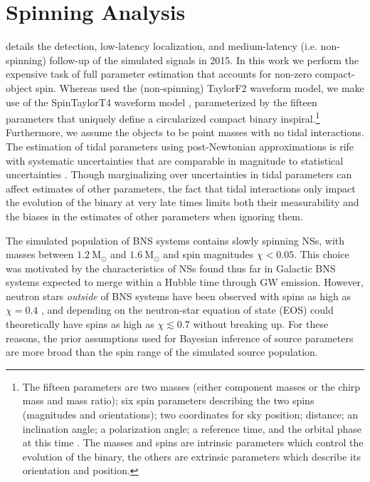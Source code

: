 \section{Spinning Analysis}
\label{sec:spin}

\citet{Singer_2014} details the detection, low-latency localization, and medium-latency (i.e. non-spinning) follow-up of the simulated signals in 2015. In this work we perform the expensive task of full parameter estimation that accounts for non-zero compact-object spin. Whereas \citet{Singer_2014} used the (non-spinning) TaylorF2 waveform model, we make use of the SpinTaylorT4 waveform model \citep{Buonanno_2003,Buonanno_2009}, parameterized by the fifteen parameters that uniquely define a circularized compact binary inspiral.\footnote{The fifteen parameters are two masses (either component masses or the chirp mass and mass ratio); six spin parameters describing the two spins (magnitudes and orientations); two coordinates for sky position; distance; an inclination angle; a polarization angle; a reference time, and the orbital phase at this time \citep[see][for more details]{Veitch_2015}. The masses and spins are intrinsic parameters which control the evolution of the binary, the others are extrinsic parameters which describe its orientation and position.} Furthermore, we assume the objects to be point masses with no tidal interactions.  The estimation of tidal parameters using post-Newtonian approximations is rife with systematic uncertainties that are comparable in magnitude to statistical uncertainties \cite{Wade_2014}. Though marginalizing over uncertainties in tidal parameters can affect estimates of other parameters, the fact that tidal interactions only impact the evolution of the binary at very late times limits both their measurability and the biases in the estimates of other parameters when ignoring them. 

The simulated population of BNS systems contains slowly spinning NSs, with masses between $1.2~\mathrm{M}_\odot$ and $1.6~\mathrm{M}_\odot$ and spin magnitudes $\chi < 0.05$.  This choice was motivated by the characteristics of NSs found thus far in Galactic BNS systems expected to merge within a Hubble time through GW emission. However, neutron stars \emph{outside} of BNS systems have been observed with spins as high as $\chi = 0.4$ \citep{Hessels_2006,Brown_2012}, and depending on the neutron-star equation of state (EOS) could theoretically have spins as high as $\chi \lesssim 0.7$ \citep{Lo_2011} without breaking up.  For these reasons, the prior assumptions used for Bayesian inference of source parameters are more broad than the spin range of the simulated source population.

